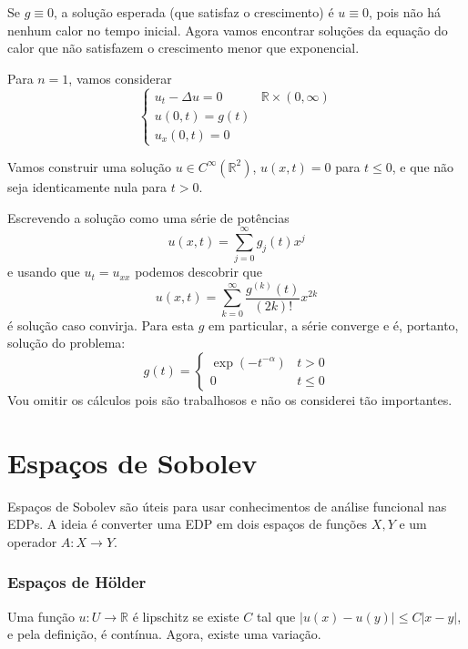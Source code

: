 \documentclass[11pt]{article}
\newcommand{\R}{\mathbb{R}}
\begin{document}
Se \( g \equiv 0 \), a solução esperada (que satisfaz o crescimento) é \( u \equiv 0 \), pois não há nenhum calor no tempo inicial. Agora vamos encontrar soluções da equação do calor que não satisfazem o crescimento menor que exponencial. 

Para \( n=1 \), vamos considerar \[ \begin{cases}
	u_t - \Delta u =0 & \R\times(0,\infty) \\
	u(0,t) = g(t)\\
	u_x(0,t)=0
\end{cases} \]

Vamos construir uma solução \( u \in C^\infty (\R^2) \), \( u(x,t) =0 \) para \( t \leq 0 \), e que não seja identicamente nula para \( t>0 \).

Escrevendo a solução como uma série de potências \[ u(x,t) = \sum_{j=0}^\infty g_j(t) x^j \] e usando que \( u_t = u_{xx} \) podemos descobrir que \[ u(x,t) = \sum_{k=0}^\infty \frac{g^{(k)}(t)}{(2k)!}x^{2k} \] é solução caso convirja. Para esta \( g \) em particular, a série converge e é, portanto, solução do problema: \[ g(t) =\begin{cases}
	\exp(-t^{-\alpha}) & t>0 \\
	0 & t \leq 0 
\end{cases} \]
Vou omitir os cálculos pois são trabalhosos e não os considerei tão importantes.












\cleardoublepage
\part{Espaços de Sobolev}
Espaços de Sobolev são úteis para usar conhecimentos de análise funcional nas EDPs. A ideia é converter uma EDP em dois espaços de funções \( X,Y \) e um operador \( A:X \rightarrow Y \).

\newcommand{\sobolevdef}{W^{k,p}(U)}
\newcommand{\sobolevum}{W^{1,p}(U)}
\newcommand{\sobolevloc}{W^{k,p}_{loc}(U)}

\section{Espaços de Hölder}

Uma função \( u:U\rightarrow \R \) é lipschitz se existe \( C \) tal que \( |u(x)-u(y)| \leq C|x-y| \), e pela definição, é contínua. Agora, existe uma variação.
\end{document}
